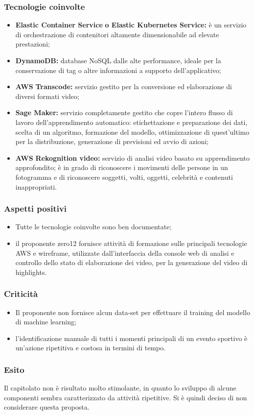 \subsubsection{Tecnologie coinvolte}
	\begin{itemize}
		\item \textbf{Elastic Container Service} \textbf{o Elastic Kubernetes Service:} è un servizio di orchestrazione di contenitori altamente dimensionabile ad elevate
		prestazioni; 
		\item \textbf{DynamoDB:} database NoSQL dalle alte performance, ideale per la conservazione di tag o altre informazioni a supporto dell'applicativo; 
		\item \textbf{AWS} \textbf{Transcode:} servizio gestito per la conversione ed elaborazione di diversi formati video; 
		\item \textbf{Sage Maker}\textbf{:} servizio completamente gestito che copre l'intero flusso di lavoro dell'apprendimento automatico: etichettazione e preparazione dei
		dati, scelta di un algoritmo, formazione del modello, ottimizzazione di quest'ultimo per la distribuzione, generazione di previsioni ed avvio di azioni; 
		\item \textbf{AWS} \textbf{Rekognition video:} servizio di analisi video basato su apprendimento approfondito; è in grado di riconoscere i movimenti delle persone
		in un fotogramma e di riconoscere soggetti, volti, oggetti, celebrità e contenuti inappropriati. 
	\end{itemize}

\subsubsection{Aspetti positivi}
	\begin{itemize}
		\item Tutte le tecnologie coinvolte sono ben documentate; 
		\item il proponente zero12 fornisce attività di formazione sulle principali tecnologie AWS e wireframe, utilizzate dall’interfaccia della console web di analisi e controllo dello stato di elaborazione dei video, per la generazione del video di highlights.
	\end{itemize}

\subsubsection{Criticità}
	\begin{itemize}
		\item Il proponente non fornisce alcun data-set per effettuare il training del modello di machine learning; 
		\item l'identificazione manuale di tutti i momenti principali di un evento sportivo è un'azione ripetitiva e costosa in termini di tempo. 
	\end{itemize}

\subsubsection{Esito}
Il capitolato non è risultato molto stimolante, in quanto lo sviluppo di alcune componenti sembra caratterizzato da attività ripetitive. Si è quindi deciso di non considerare questa proposta. 
